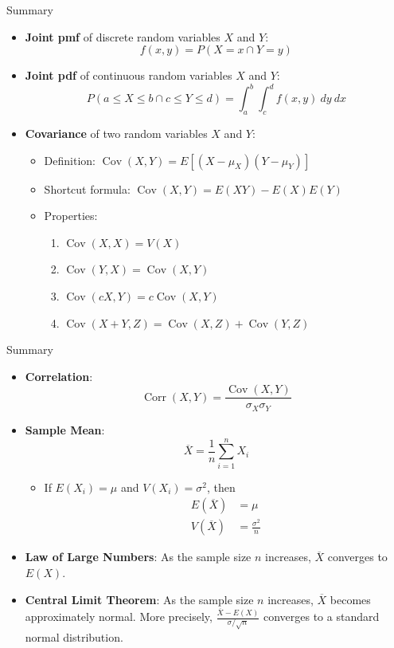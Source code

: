 \documentclass[handout]{beamer}
\DeclareMathOperator{\Cov}{Cov}
\DeclareMathOperator{\Corr}{Corr}
\begin{document}
\begin{frame}{Summary}
\begin{itemize}
\item \textbf{Joint pmf} of discrete random variables $X$ and $Y$: $$f(x,y)=P(X=x \cap Y=y)$$
\item \textbf{Joint pdf} of continuous random variables $X$ and $Y$: 
$$P(a \leq X \leq b \cap c \leq Y \leq d)=\int_{a}^b\int_{c}^d f(x,y)\ dy\ dx$$
\item \textbf{Covariance} of two random variables $X$ and $Y$:
\begin{itemize}
\item Definition: $\Cov(X,Y) = E[(X-\mu_X)(Y-\mu_Y)]$
\vspace{.08in}
\item Shortcut formula: $\Cov(X,Y)=E(XY)-E(X)E(Y)$
\item Properties:
\begin{enumerate}
\item $\Cov(X,X) = V(X)$
\item $\Cov(Y,X) = \Cov(X,Y)$
\item $\Cov(cX,Y) = c\Cov(X,Y)$
\item $\Cov(X+Y,Z) = \Cov(X,Z)+\Cov(Y,Z)$
\end{enumerate}
\end{itemize}
\end{itemize}
\end{frame}

\begin{frame}{Summary}

\begin{itemize}
\item \textbf{Correlation}: $$\Corr(X,Y)=\frac{\Cov(X,Y)}{\sigma_X\sigma_Y}$$
\item \textbf{Sample Mean}: $$\overline X = \frac1n\sum_{i=1}^n X_i$$
\begin{itemize}
\item If $E(X_i)=\mu$ and $V(X_i)=\sigma^2$, then 
\begin{align*}
E(\overline X)&=\mu\\
V(\overline X)&=\frac{\sigma^2}n
\end{align*}
\end{itemize}
\item \textbf{Law of Large Numbers}: As the sample size $n$ increases, $\overline{X}$ converges to $E(X)$.
\item \textbf{Central Limit Theorem}: As the sample size $n$ increases, $\overline X$ becomes approximately normal. More precisely, $\frac{\overline{X}-E(X)}{\sigma/\sqrt{n}}$ converges to a standard normal distribution.
\end{itemize}
\end{frame}
\end{document}
